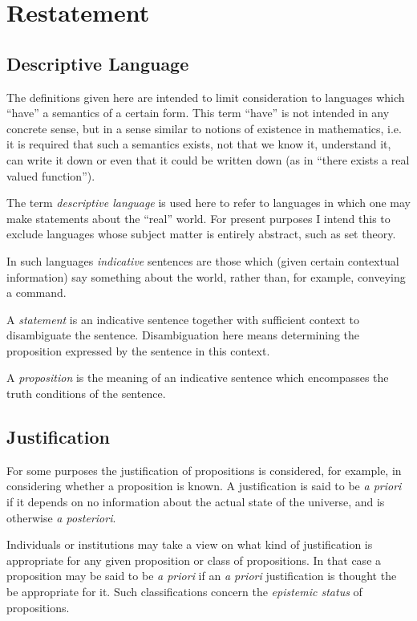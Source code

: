 \chapter{Restatement}\label{Restatement}

\section{Descriptive Language}

The definitions given here are intended to limit consideration to languages which ``have'' a semantics of a certain form.
This term ``have'' is not intended in any concrete sense, but in a sense similar to notions of existence in mathematics, i.e. it is required that such a semantics exists, not that we know it, understand it, can write it down or even that it could be written down (as in ``there exists a real valued function'').

The term {\it descriptive language} is used here to refer to languages in which one may make statements about the ``real'' world.
For present purposes I intend this to exclude languages whose subject matter is entirely abstract, such as set theory.

In such languages {\it indicative} sentences are those which (given certain contextual information) say something about the world, rather than, for example, conveying a command.

A {\it statement} is an indicative sentence together with sufficient context to disambiguate the sentence.
Disambiguation here means determining the proposition expressed by the sentence in this context.

A {\it proposition} is the meaning of an indicative sentence which encompasses the truth conditions of the sentence.

\section{Justification}

For some purposes the justification of propositions is considered, for example, in considering whether a proposition is known.
A justification is said to be {\it a priori} if it depends on no information about the actual state of the universe, and is otherwise {\it a posteriori}.

Individuals or institutions may take a view on what kind of justification is appropriate for any given proposition or class of propositions.
In that case a proposition may be said to be {\it a priori} if an {\it a priori} justification is thought the be appropriate for it.
Such classifications concern the {\it epistemic status} of propositions.


